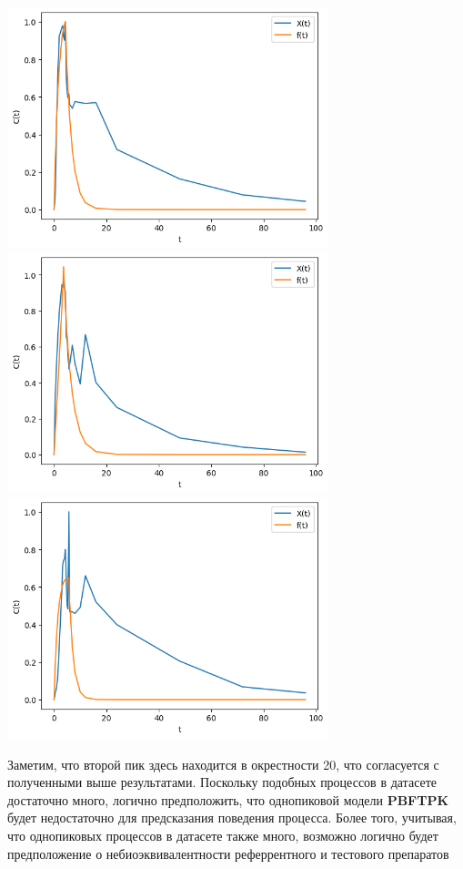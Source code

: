 \documentclass{article}
\begin{document}
\includegraphics[width=0.7\textwidth, left]{example4.png}
\includegraphics[width=0.7\textwidth, left]{example5.png}
\includegraphics[width=0.7\textwidth, left]{example6.png}

Заметим, что второй пик здесь находится в окрестности 20, что согласуется с полученными выше результатами. Поскольку подобных процессов в датасете достаточно много, логично предположить, что однопиковой модели \textbf{PBFTPK} будет недостаточно для предсказания поведения процесса. Более того, учитывая, что однопиковых процессов в датасете также много, возможно логично будет предположение о небиоэквивалентности реферрентного и тестового препаратов
\end{document}
